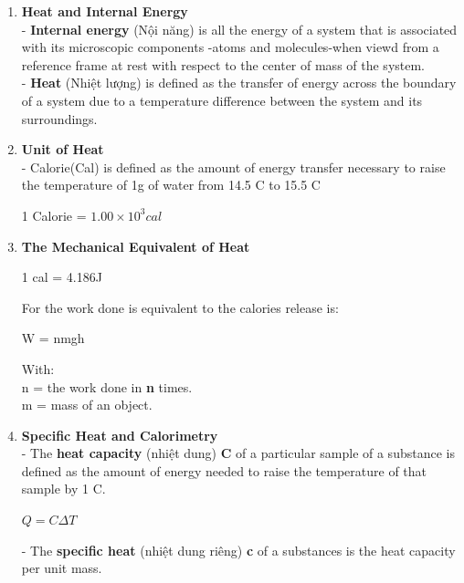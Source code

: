 \documentclass[10pt]{article}
\begin{document}
\begin{enumerate}
	\item \textbf{Heat and Internal Energy}\\
	- \textbf{Internal energy} (Nội năng) is all the energy of a system that is associated with its microscopic components -atoms and molecules-when viewd from a reference frame at rest with respect to the center of mass of the system.\\
	- \textbf{Heat} (Nhiệt lượng) is defined as the transfer of energy across the boundary of a system due to a temperature difference between the system and its surroundings.\\
	\item \textbf{Unit of Heat}\\
	- Calorie(Cal) is defined as the amount of energy transfer necessary to raise the temperature of 1g of water from 14.5 \degree C to 15.5 \degree C
	\begin{mybox}
	\begin{center}
	1 Calorie = $1.00 \times 10^3 cal$
	\end{center}
	\end{mybox}
	\item \textbf{The Mechanical Equivalent of Heat}
	\begin{mybox}
	\begin{center}
	1 cal = 4.186J
	\end{center}
	\end{mybox}
	For the work done is equivalent to the calories release is:
	\begin{mybox}
	\begin{center}
	W = nmgh
	\end{center}
	\end{mybox}
	With:\\
	n = the work done in \textbf{n} times.\\
	m = mass of an object.\\
	\item \textbf{Specific Heat and Calorimetry}\\
	- The \textbf{heat capacity} (nhiệt dung) \textbf{C} of a particular sample of a substance is defined as the amount of energy needed to raise the temperature of that sample by 1 \degree C.
	\begin{mybox}
	\begin{center}
	$Q = C \Delta T$
	\end{center}
	\end{mybox}
	- The \textbf{specific heat} (nhiệt dung riêng) \textbf{c} of a substances is the heat capacity per unit mass.

\end{enumerate}
\end{document}
